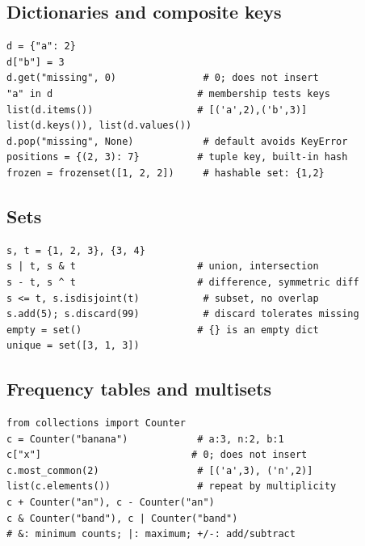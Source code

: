 \subsection{Dictionaries and composite keys}
\begin{lstlisting}[label=py:dict]
d = {"a": 2}
d["b"] = 3
d.get("missing", 0)               # 0; does not insert
"a" in d                         # membership tests keys
list(d.items())                  # [('a',2),('b',3)]
list(d.keys()), list(d.values())
d.pop("missing", None)            # default avoids KeyError
positions = {(2, 3): 7}          # tuple key, built-in hash
frozen = frozenset([1, 2, 2])     # hashable set: {1,2}
\end{lstlisting}

\subsection{Sets}
\begin{lstlisting}[label=py:sets]
s, t = {1, 2, 3}, {3, 4}
s | t, s & t                     # union, intersection
s - t, s ^ t                     # difference, symmetric diff
s <= t, s.isdisjoint(t)           # subset, no overlap
s.add(5); s.discard(99)           # discard tolerates missing
empty = set()                    # {} is an empty dict
unique = set([3, 1, 3])
\end{lstlisting}

\subsection{Frequency tables and multisets}
\begin{lstlisting}[label=py:counter]
from collections import Counter
c = Counter("banana")            # a:3, n:2, b:1
c["x"]                          # 0; does not insert
c.most_common(2)                 # [('a',3), ('n',2)]
list(c.elements())               # repeat by multiplicity
c + Counter("an"), c - Counter("an")
c & Counter("band"), c | Counter("band")
# &: minimum counts; |: maximum; +/-: add/subtract
\end{lstlisting}

